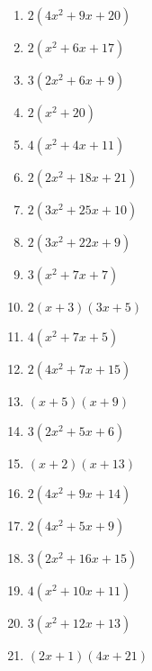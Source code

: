 \documentclass[9pt,dvipdfmx,a4paper]{article}
\begin{document}
\begin{multicols}{2}
\begin{enumerate}
\item
$ 2 \left(4 x^{2} + 9 x + 20\right)$

\item
$ 2 \left(x^{2} + 6 x + 17\right)$

\item
$ 3 \left(2 x^{2} + 6 x + 9\right)$

\item
$ 2 \left(x^{2} + 20\right)$

\item
$ 4 \left(x^{2} + 4 x + 11\right)$

\item
$ 2 \left(2 x^{2} + 18 x + 21\right)$

\item
$ 2 \left(3 x^{2} + 25 x + 10\right)$

\item
$ 2 \left(3 x^{2} + 22 x + 9\right)$

\item
$ 3 \left(x^{2} + 7 x + 7\right)$

\item
$ 2 \left(x + 3\right) \left(3 x + 5\right)$

\item
$ 4 \left(x^{2} + 7 x + 5\right)$

\item
$ 2 \left(4 x^{2} + 7 x + 15\right)$

\item
$ \left(x + 5\right) \left(x + 9\right)$

\item
$ 3 \left(2 x^{2} + 5 x + 6\right)$

\item
$ \left(x + 2\right) \left(x + 13\right)$

\item
$ 2 \left(4 x^{2} + 9 x + 14\right)$

\item
$ 2 \left(4 x^{2} + 5 x + 9\right)$

\item
$ 3 \left(2 x^{2} + 16 x + 15\right)$

\item
$ 4 \left(x^{2} + 10 x + 11\right)$

\item
$ 3 \left(x^{2} + 12 x + 13\right)$

\item
$ \left(2 x + 1\right) \left(4 x + 21\right)$


\end{enumerate}
\end{multicols}
\end{document}
